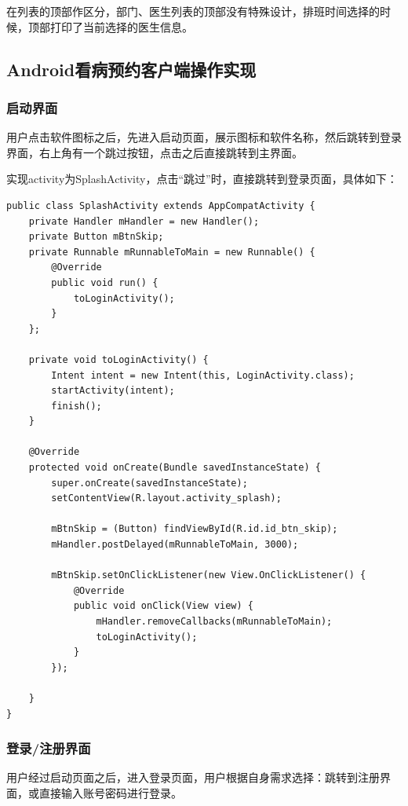 \documentclass[UTF8,12pt]{article}
\begin{document}
在列表的顶部作区分，部门、医生列表的顶部没有特殊设计，排班时间选择的时候，顶部打印了当前选择的医生信息。

\newpage

\subsection{Android看病预约客户端操作实现}
\subsubsection{启动界面}
用户点击软件图标之后，先进入启动页面，展示图标和软件名称，然后跳转到登录界面，右上角有一个跳过按钮，点击之后直接跳转到主界面。

实现activity为SplashActivity，点击“跳过”时，直接跳转到登录页面，具体如下：

\begin{lstlisting}[frame=shadowbox]
    public class SplashActivity extends AppCompatActivity {
    private Handler mHandler = new Handler();
    private Button mBtnSkip;
    private Runnable mRunnableToMain = new Runnable() {
        @Override
        public void run() {
            toLoginActivity();
        }
    };

    private void toLoginActivity() {
        Intent intent = new Intent(this, LoginActivity.class);
        startActivity(intent);
        finish();
    }

    @Override
    protected void onCreate(Bundle savedInstanceState) {
        super.onCreate(savedInstanceState);
        setContentView(R.layout.activity_splash);

        mBtnSkip = (Button) findViewById(R.id.id_btn_skip);
        mHandler.postDelayed(mRunnableToMain, 3000);

        mBtnSkip.setOnClickListener(new View.OnClickListener() {
            @Override
            public void onClick(View view) {
                mHandler.removeCallbacks(mRunnableToMain);
                toLoginActivity();
            }
        });

    }
}

\end{lstlisting}

\subsubsection{登录/注册界面}
用户经过启动页面之后，进入登录页面，用户根据自身需求选择：跳转到注册界面，或直接输入账号密码进行登录。
\end{document}
